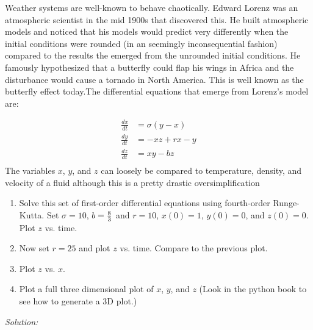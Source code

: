 \begin{enumerate}
  \prob Weather systems are well-known to behave chaotically.  Edward
  Lorenz was an atmospheric scientist in the mid 1900s that discovered
  this. He built atmospheric models and noticed that his models would
  predict very differently when the initial conditions were rounded
  (in an seemingly inconsequential fashion) compared to the results
  the emerged from the unrounded initial conditions. He famously
  hypothesized that a butterfly could flap his wings in Africa and the
  disturbance would cause a tornado in North America.  This is well
  known as the butterfly effect today.The differential equations that
  emerge from Lorenz's model are:

\begin{align}
\frac{dx}{dt} &= \sigma \left( y - x\right)\\
\frac{dy}{dt} &= - x z + rx - y\\
\frac{dz}{dt} &= xy - bz\\
\end{align}
The variables $x$, $y$, and $z$ can loosely be compared to
temperature, density, and velocity of a fluid although this is a
pretty drastic oversimplification

\begin{enumerate}
\item Solve this set of first-order differential equations using
fourth-order Runge-Kutta.  Set $ \sigma = 10$, $b = {8\over 3}$ and $r
= 10$, $x(0) = 1$, $y(0) = 0$, and $z(0)=0$.  Plot $z$ vs. time.
\item Now set $r = 25$ and plot $z$ vs. time.  Compare to the previous
  plot.
\item Plot $z$ vs. $x$.
\item Plot a full three dimensional plot of $x$, $y$, and $z$ (Look in
  the python book to see how to generate a 3D plot.)
\end{enumerate}
\end{enumerate}
\ifsolutions
\textit{Solution:}\\
